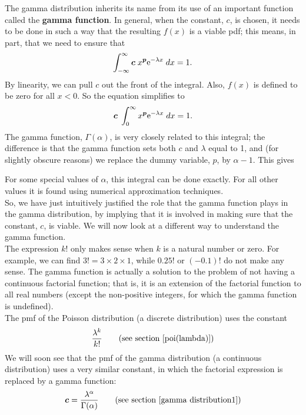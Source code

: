 \noindent The gamma distribution inherits its name from its use of an important function called the \textbf{gamma function}. In general, when the constant, $c$, is chosen, it needs to be done in such a way that the resulting $f(x)$ is a viable pdf; this means, in part, that we need to ensure that
\[
\int_{-\infty}^\infty \boldsymbol{c}\;x^{\boldsymbol{p}} \mathrm{e}^{-\lambda x} \; dx = 1.
\]
By linearity, we can pull $c$ out the front of the integral. Also, $f(x)$ is defined to be zero for all $x < 0$. So the equation simplifies to
\[
\boldsymbol{c} \; \int_{0}^\infty x^{\boldsymbol{p}} \mathrm{e}^{-\lambda x} \; dx = 1.
\] 
The gamma function, $\Gamma(\alpha)$, is very closely related to this integral; the difference is that the gamma function sets both $c$ and $\lambda$ equal to 1, and (for slightly obscure reasons) we replace the dummy variable, $p$, by $\alpha - 1$. This gives 

  	\bigskip
	
	\hfil{}
	\bigskip

\noindent For some special values of $\alpha$, this integral can be done exactly. For all other values it is found using numerical approximation techniques. \\

\noindent So, we have just intuitively justified the role that the gamma function plays in the gamma distribution, by implying that it is involved in making sure that the constant, $c$, is viable. We will now look at a different way to understand the gamma function. \\

\noindent The expression $k!$ only makes sense when $k$ is a natural number or zero. For example, we can find $3! = 3\times2\times1$, while $0.25!$ or $(-0.1)!$ do not make any sense. The gamma function is actually a solution to the problem of not having a continuous factorial function; that is, it is an extension of the factorial function to all real numbers (except the non-positive integers, for which the gamma function is undefined). \\

\noindent The pmf of the Poisson distribution (a discrete distribution) uses the constant
\[
\frac{\lambda^k}{k!} \tag{see section \ref{poi(lambda)}}
\]
We will soon see that the pmf of the gamma distribution (a continuous distribution) uses a very similar constant, in which the factorial expression is replaced by a gamma function:
\[
\boldsymbol{c} = \frac{\lambda^\alpha}{\Gamma(\alpha)} \tag{see section \ref{gamma distribution1}}
\]
